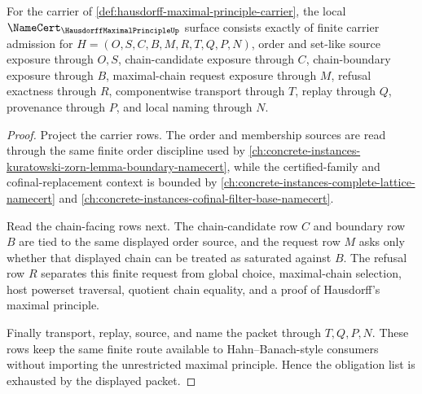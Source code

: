 \begin{theorem}
\label{thm:hausdorff-maximal-principle-namecert-obligations}
For the carrier of \autoref{def:hausdorff-maximal-principle-carrier}, the local $\NameCert_{\HausdorffMaximalPrincipleUp}$ surface consists exactly of finite carrier admission for $H=(O,S,C,B,M,R,T,Q,P,N)$, order and set-like source exposure through $O,S$, chain-candidate exposure through $C$, chain-boundary exposure through $B$, maximal-chain request exposure through $M$, refusal exactness through $R$, componentwise transport through $T$, replay through $Q$, provenance through $P$, and local naming through $N$.
\end{theorem}
\begin{proof}
Project the carrier rows. The order and membership sources are read through the same finite order discipline used by \autoref{ch:concrete-instances-kuratowski-zorn-lemma-boundary-namecert}, while the certified-family and cofinal-replacement context is bounded by \autoref{ch:concrete-instances-complete-lattice-namecert} and \autoref{ch:concrete-instances-cofinal-filter-base-namecert}.

Read the chain-facing rows next. The chain-candidate row $C$ and boundary row $B$ are tied to the same displayed order source, and the request row $M$ asks only whether that displayed chain can be treated as saturated against $B$. The refusal row $R$ separates this finite request from global choice, maximal-chain selection, host powerset traversal, quotient chain equality, and a proof of Hausdorff's maximal principle.

Finally transport, replay, source, and name the packet through $T,Q,P,N$. These rows keep the same finite route available to Hahn--Banach-style consumers without importing the unrestricted maximal principle. Hence the obligation list is exhausted by the displayed packet.
\end{proof}

